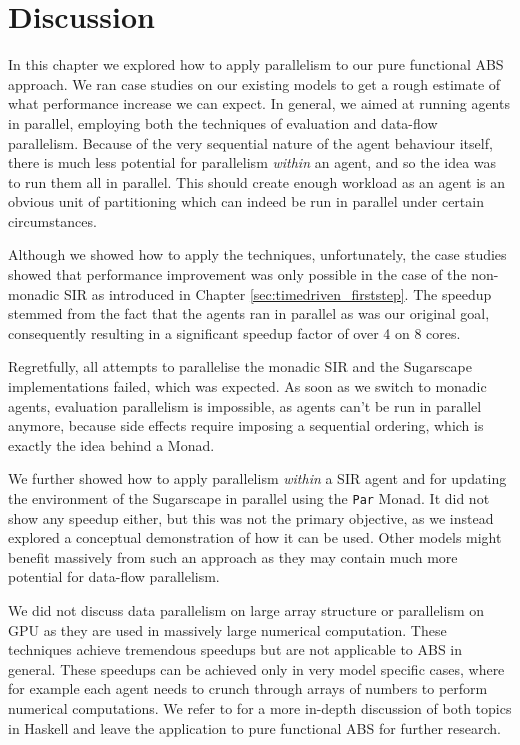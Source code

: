 \section{Discussion}
In this chapter we explored how to apply parallelism to our pure functional ABS approach. We ran case studies on our existing models to get a rough estimate of what performance increase we can expect. In general, we aimed at running agents in parallel, employing both the techniques of evaluation and data-flow parallelism. Because of the very sequential nature of the agent behaviour itself, there is much less potential for parallelism \textit{within} an agent, and so the idea was to run them all in parallel. This should create enough workload as an agent is an obvious unit of partitioning which can indeed be run in parallel under certain circumstances.

Although we showed how to apply the techniques, unfortunately, the case studies showed that performance improvement was only possible in the case of the non-monadic SIR as introduced in Chapter \ref{sec:timedriven_firststep}. The speedup stemmed from the fact that the agents ran in parallel as was our original goal, consequently resulting in a significant speedup factor of over 4 on 8 cores. 

Regretfully, all attempts to parallelise the monadic SIR and the Sugarscape implementations failed, which was expected. As soon as we switch to monadic agents, evaluation parallelism is impossible, as agents can't be run in parallel anymore, because side effects require imposing a sequential ordering, which is exactly the idea behind a Monad.

We further showed how to apply parallelism \textit{within} a SIR agent and for updating the environment of the Sugarscape in parallel using the \texttt{Par} Monad. It did not show any speedup either, but this was not the primary objective, as we instead explored a conceptual demonstration of how it can be used. Other models might benefit massively from such an approach as they may contain much more potential for data-flow parallelism.

We did not discuss data parallelism on large array structure or parallelism on GPU as they are used in massively large numerical computation. These techniques achieve tremendous speedups but are not applicable to ABS in general. These speedups can be achieved only in very model specific cases, where for example each agent needs to crunch through arrays of numbers to perform numerical computations. We refer to \cite{marlow_parallel_2013} for a more in-depth discussion of both topics in Haskell and leave the application to pure functional ABS for further research.


